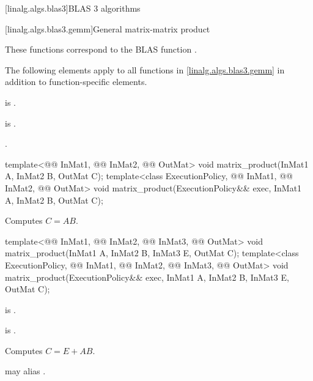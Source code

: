 [linalg.algs.blas3]{BLAS 3 algorithms}

[linalg.algs.blas3.gemm]{General matrix-matrix product}

\pnum
\begin{note}
These functions correspond to the BLAS function \supercite{blas3}.
\end{note}

\pnum
The following elements apply
to all functions in \ref{linalg.algs.blas3.gemm}
in addition to function-specific elements.

\pnum
\mandates
{}
is .

\pnum
\expects
{} is .

\pnum
\complexity
{}.

%
\begin{itemdecl}
  template<@@ InMat1, @@ InMat2, @@ OutMat>
    void matrix_product(InMat1 A, InMat2 B, OutMat C);
  template<class ExecutionPolicy, @@ InMat1, @@ InMat2, @@ OutMat>
    void matrix_product(ExecutionPolicy&& exec, InMat1 A, InMat2 B, OutMat C);
\end{itemdecl}

\begin{itemdescr}
\pnum
\effects
Computes $C = A B$.
\end{itemdescr}

%
\begin{itemdecl}
template<@@ InMat1, @@ InMat2, @@ InMat3, @@ OutMat>
  void matrix_product(InMat1 A, InMat2 B, InMat3 E, OutMat C);
template<class ExecutionPolicy,
         @@ InMat1, @@ InMat2, @@ InMat3, @@ OutMat>
  void matrix_product(ExecutionPolicy&& exec, InMat1 A, InMat2 B, InMat3 E, OutMat C);
\end{itemdecl}

\begin{itemdescr}
\pnum
\mandates
{} is .

\pnum
\expects
{} is .

\pnum
\effects
Computes $C = E + A B$.

\pnum
\remarks
{} may alias .
\end{itemdescr}

